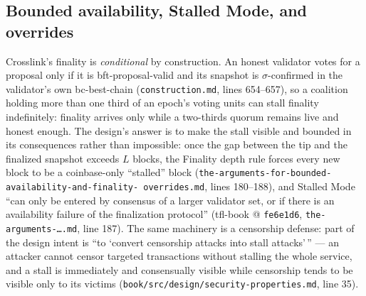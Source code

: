 \documentclass[11pt,a4paper]{article}
\theoremstyle{definition}
\begin{document}
\subsection{Bounded availability, Stalled Mode, and overrides}
\label{sec:xl-bounded}

Crosslink's finality is \emph{conditional} by construction. An honest
validator votes for a proposal only if it is bft-proposal-valid and its
snapshot is $\sigma$-confirmed in the validator's own bc-best-chain
(\texttt{construction.md}, lines 654--657), so a coalition holding more
than one third of an epoch's voting units can stall finality
indefinitely: finality arrives only while a two-thirds quorum remains
live and honest enough. The design's answer is to make the stall visible
and bounded in its consequences rather than impossible: once the gap
between the tip and the finalized snapshot exceeds $L$ blocks, the
Finality depth rule forces every new block to be a coinbase-only
``stalled'' block
(\texttt{the-arguments-for-bounded-availability-and-finality-%
overrides.md}, lines 180--188), and Stalled Mode ``can only be entered by
consensus of a larger validator set, or if there is an availability
failure of the finalization protocol'' (tfl-book @ \texttt{fe6e1d6},
\texttt{the-arguments-\ldots.md},
line 187). The same machinery is a censorship defense: part of the design
intent is ``to `convert censorship attacks into stall attacks'\,'' --- an
attacker cannot censor targeted transactions without stalling the whole
service, and a stall is immediately and consensually visible while
censorship tends to be visible only to its victims
(\texttt{book/src/design/security-properties.md}, line 35).
\end{document}
